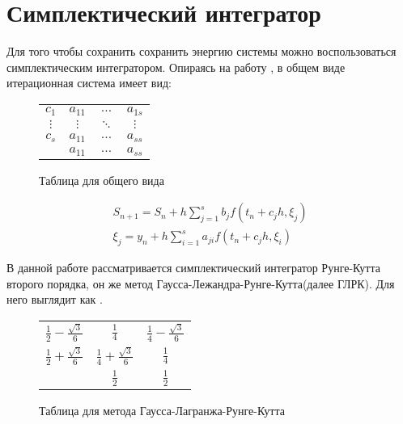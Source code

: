 \section{Симплектический интегратор}

Для того чтобы сохранить сохранить энергию системы можно воспользоваться
симплектическим интегратором. Опираясь на работу \citet[стр.~3]{Markiewicz1999},
в общем виде итерационная система имеет вид:
\begin{figure}[h]
    \renewcommand{\arraystretch}{1.2}
    \centering
    \begin{tabular}{c|ccc}
        $c_1$    & $a_{11}$ & $\ldots$ & $a_{1s}$ \\
        $\vdots$ & $\vdots$ & $\ddots$ & $\vdots$ \\
        $c_s$    & $a_{11}$ & $\ldots$ & $a_{ss}$ \\ \hline
                 & $a_{11}$ & $\ldots$ & $a_{ss}$ \\
    \end{tabular}
    \caption{Таблица для общего вида}
\label{tab:tableau_basic}
\end{figure}

\begin{equation}\label{eq:base_form}
    \begin{gathered}
        S_{n+1} = S_n + h\sum_{j=1}^s b_j f(t_n+c_jh, \xi_j)
        \\
        \xi_j = y_n + h\sum_{i=1}^{s}a_{ji} f(t_n+c_jh, \xi_i)
    \end{gathered}
\end{equation}

В данной работе рассматривается симплектический интегратор Рунге-Кутта
второго порядка, он же метод Гаусса-Лежандра-Рунге-Кутта(далее ГЛРК). Для него
 выглядит как .

\begin{figure}[h]
    \centering
    \begin{tabular}{c|cc}
        $\frac12 - \frac{\sqrt3}6$ & $\frac14$                  & $\frac14 - \frac{\sqrt3}6$ \\
        $\frac12 + \frac{\sqrt3}6$ & $\frac14 + \frac{\sqrt3}6$ & $\frac14$ \\ \hline
                                   & $\frac12$                  & $\frac12$
    \end{tabular}
    \caption{Таблица для метода Гаусса-Лагранжа-Рунге-Кутта}
\label{tab:gauss-lagr}
\end{figure}

